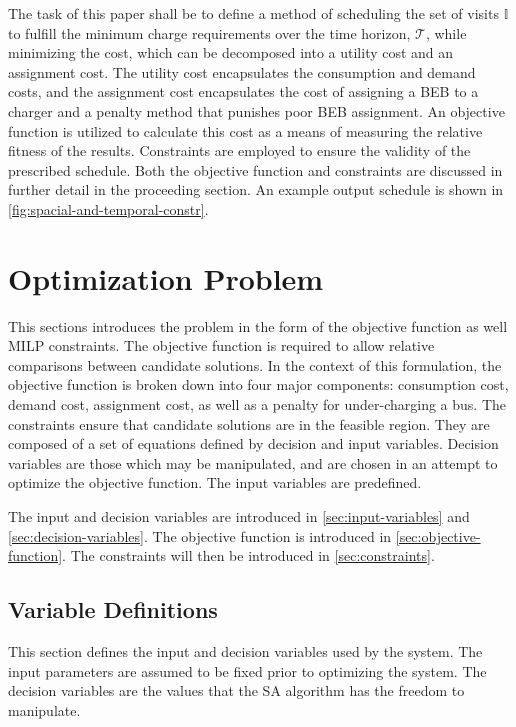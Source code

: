 \documentclass[11pt,a4paper,final]{article}
\newcommand{\T}{\mathcal{T}}                %
\newcommand{\I}{\mathbb{I}}                 %
\begin{document}
The task of this paper shall be to define a method of scheduling the set of visits \(\I\) to fulfill the minimum charge
requirements over the time horizon, \(\T\), while minimizing the cost, which can be decomposed into a utility cost and an
assignment cost. The utility cost encapsulates the consumption and demand costs, and the assignment cost encapsulates
the cost of assigning a BEB to a charger and a penalty method that punishes poor BEB assignment. An objective function
is utilized to calculate this cost as a means of measuring the relative fitness of the results. Constraints are employed
to ensure the validity of the prescribed schedule. Both the objective function and constraints are discussed in further
detail in the proceeding section. An example output schedule is shown in \ref{fig:spacial-and-temporal-constr}.
\section{Optimization Problem}
\label{sec:optimization-problem}
This sections introduces the problem in the form of the objective function as well MILP constraints. The objective
function is required to allow relative comparisons between candidate solutions. In the context of this formulation, the
objective function is broken down into four major components: consumption cost, demand cost, assignment cost, as well as
a penalty for under-charging a bus. The constraints ensure that candidate solutions are in the feasible region. They are
composed of a set of equations defined by decision and input variables. Decision variables are those which may be
manipulated, and are chosen in an attempt to optimize the objective function. The input variables are predefined.

The input and decision variables are introduced in \ref{sec:input-variables} and \ref{sec:decision-variables}. The
objective function is introduced in \ref{sec:objective-function}. The constraints will then be introduced in
\ref{sec:constraints}.

\subsection{Variable Definitions}
\label{sec:parameter-definitions}
This section defines the input and decision variables used by the system. The input parameters are assumed to be fixed
prior to optimizing the system. The decision variables are the values that the SA algorithm has the freedom to
manipulate.
\end{document}
